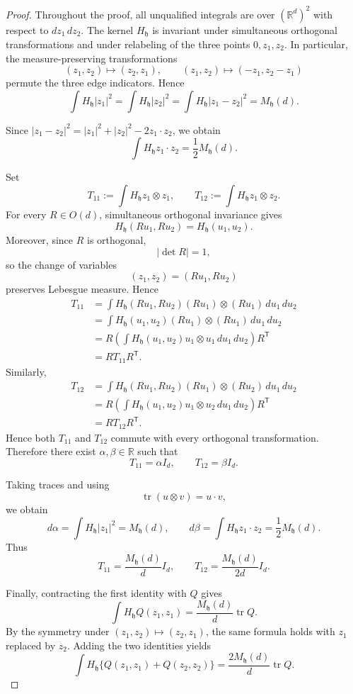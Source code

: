 \documentclass[11pt]{article}
\theoremstyle{remark}
\newcommand{\R}{\mathbb R}
\numberwithin{equation}{section}
\begin{document}
\begin{proof}
Throughout the proof, all unqualified integrals are over
\((\R^d)^2\) with respect to \(dz_1\,dz_2\).
The kernel \(H_{\mathfrak h}\) is invariant under simultaneous
orthogonal transformations and under relabeling of the three points
\(0,z_1,z_2\).  In particular, the measure-preserving transformations
\[
(z_1,z_2)\longmapsto(z_2,z_1),
\qquad
(z_1,z_2)\longmapsto(-z_1,z_2-z_1)
\]
permute the three edge indicators.  Hence
\[
\int H_{\mathfrak h}|z_1|^2
=
\int H_{\mathfrak h}|z_2|^2
=
\int H_{\mathfrak h}|z_1-z_2|^2
=
M_{\mathfrak h}(d).
\]


Since
$|z_1-z_2|^2
=
|z_1|^2+|z_2|^2-2z_1\cdot z_2$,
we obtain
\[
\int H_{\mathfrak h}z_1\cdot z_2
=
\frac12M_{\mathfrak h}(d).
\]

Set
\[
T_{11}
:=
\int H_{\mathfrak h}z_1\otimes z_1,
\qquad
T_{12}
:=
\int H_{\mathfrak h}z_1\otimes z_2.
\]
For every \(R\in O(d)\), simultaneous orthogonal invariance gives
\[
H_{\mathfrak h}(Ru_1,Ru_2)
=
H_{\mathfrak h}(u_1,u_2).
\]
Moreover, since \(R\) is orthogonal,
\[
|\det R|=1,
\]
so the change of variables
\[
(z_1,z_2)=(Ru_1,Ru_2)
\]
preserves Lebesgue measure.  Hence
\[
\begin{aligned}
T_{11}
&=
\int
H_{\mathfrak h}(Ru_1,Ru_2)
(Ru_1)\otimes(Ru_1)\,du_1\,du_2\\
&=
\int
H_{\mathfrak h}(u_1,u_2)
(Ru_1)\otimes(Ru_1)\,du_1\,du_2\\
&=
R\left(
\int
H_{\mathfrak h}(u_1,u_2)
u_1\otimes u_1\,du_1\,du_2
\right)R^{\mathsf T}\\
&=
RT_{11}R^{\mathsf T}.
\end{aligned}
\]
Similarly,
\[
\begin{aligned}
T_{12}
&=
\int
H_{\mathfrak h}(Ru_1,Ru_2)
(Ru_1)\otimes(Ru_2)\,du_1\,du_2\\
&=
R\left(
\int
H_{\mathfrak h}(u_1,u_2)
u_1\otimes u_2\,du_1\,du_2
\right)R^{\mathsf T}\\
&=
RT_{12}R^{\mathsf T}.
\end{aligned}
\]
Hence both \(T_{11}\) and \(T_{12}\) commute with every orthogonal
transformation.  Therefore there exist \(\alpha,\beta\in\R\) such that
\[
T_{11}=\alpha I_d,
\qquad
T_{12}=\beta I_d.
\]

Taking traces and using
\[
\operatorname{tr}(u\otimes v)=u\cdot v,
\]
we obtain
\[
d\alpha
=
\int H_{\mathfrak h}|z_1|^2
=
M_{\mathfrak h}(d),\qquad
d\beta
=
\int H_{\mathfrak h}z_1\cdot z_2
=
\frac12M_{\mathfrak h}(d).
\]
Thus
\[
T_{11}
=
\frac{M_{\mathfrak h}(d)}{d}I_d,
\qquad
T_{12}
=
\frac{M_{\mathfrak h}(d)}{2d}I_d.
\]

Finally, contracting the first identity with \(Q\) gives
\[
\int H_{\mathfrak h}Q(z_1,z_1)
=
\frac{M_{\mathfrak h}(d)}{d}\operatorname{tr}Q.
\]
By the symmetry under
\((z_1,z_2)\mapsto(z_2,z_1)\),
the same formula holds with \(z_1\) replaced by \(z_2\).  Adding the
two identities yields
\[
\int H_{\mathfrak h}
\bigl\{Q(z_1,z_1)+Q(z_2,z_2)\bigr\}
=
\frac{2M_{\mathfrak h}(d)}{d}\operatorname{tr}Q.
\]
\end{proof}
\end{document}
